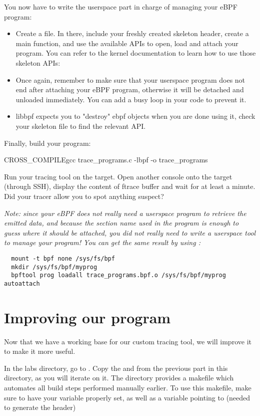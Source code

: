 You now have to write the userspace part in charge of managing your eBPF program:
\begin{itemize}
  \item Create a  file. In there, include your freshly created skeleton header, create a main function, and use the available APIs to open, load and attach your program. You can refer to the kernel documentation to learn how to use those skeleton APIs: 
  \item Once again, remember to make sure that your userspace program does not end after attaching your eBPF program, otherwise it will be detached and unloaded immediately. You can add a busy loop in your code to prevent it.
  \item libbpf expects you to "destroy" ebpf objects when you are done using it, check your skeleton file to find the relevant API.
\end{itemize}

Finally, build your program:
\begin{bashinput}
$ ${CROSS_COMPILE}gcc trace_programs.c -lbpf -o trace_programs
\end{bashinput}
Run your tracing tool on the target. Open another console onto the target (through SSH), display the content of ftrace buffer and wait for at least a minute. Did your tracer allow you to spot anything suspect?

{\em Note: since your eBPF does not really need a userspace program to retrieve
the emitted data, and because the section name used in the program is enough to
guess where it should be attached, you did not really need to write a userspace tool to manage
your program! You can get the same result by using :}
\begin{verbatim}
  mount -t bpf none /sys/fs/bpf
  mkdir /sys/fs/bpf/myprog
  bpftool prog loadall trace_programs.bpf.o /sys/fs/bpf/myprog autoattach
\end{verbatim}
\section{Improving our program}

Now that we have a working base for our custom tracing tool, we will improve it
to make it more useful.

In the labs directory, go to . Copy the  and  from the previous part in this directory, as you will iterate on it. The directory provides a makefile which automates all build steps performed manually earlier. To use this makefile, make sure to have your  variable properly set, as well as a  variable pointing to  (needed to generate the  header)

